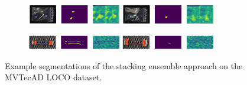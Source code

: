\begin{figure}[H]
\begin{subfigure}[b]{\textwidth}
    \end{subfigure}
    \begin{subfigure}[b]{\textwidth}
        \centering
        \includegraphics[width=0.45\textwidth]{figures/appendix/appendix_main_ensemble/SB/image_prediction_140.png}
        \hfill
        \includegraphics[width=0.45\textwidth]{figures/appendix/appendix_main_ensemble/SB/image_prediction_307.png}

    \end{subfigure}
    \begin{subfigure}[b]{\textwidth}
        \centering
        \includegraphics[width=0.45\textwidth]{figures/appendix/appendix_main_ensemble/SC/image_prediction_167.png}
        \hfill
        \includegraphics[width=0.45\textwidth]{figures/appendix/appendix_main_ensemble/SC/image_prediction_261.png}

    \end{subfigure}
    
    \caption{Example segmentations of the stacking ensemble approach on the MVTecAD LOCO \cite{LOCODentsAndScratchesBergmann2022} dataset.}
    \label{fig:appendixEnsemble}
\end{figure}